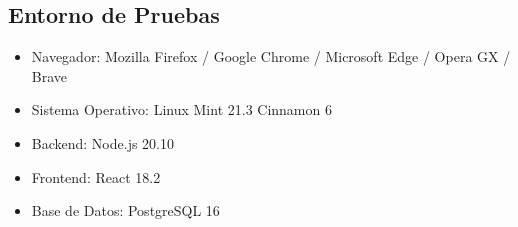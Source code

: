 \documentclass[12pt,letterpaper,spanish]{report}
\begin{document}
\subsection{Entorno de Pruebas}
\begin{itemize}
    \item Navegador: Mozilla Firefox / Google Chrome / Microsoft Edge / Opera GX / Brave
    \item Sistema Operativo: Linux Mint 21.3 Cinnamon 6
    \item Backend: Node.js 20.10 
    \item Frontend: React 18.2  
    \item Base de Datos: PostgreSQL 16
\end{itemize}

\end{document}
